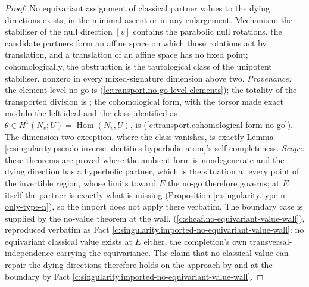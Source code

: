 \documentclass[11pt]{article}
\theoremstyle{definition}
\theoremstyle{plain}
\begin{document}
\begin{proof}
No equivariant assignment of classical partner values to the dying directions exists, in the minimal ascent or in any enlargement. Mechanism: the stabiliser of the null direction $[v]$ contains the parabolic null rotations, the candidate partners form an affine space on which those rotations act by translation, and a translation of an affine space has no fixed point; cohomologically, the obstruction is the tautological class of the unipotent stabiliser, nonzero in every mixed-signature dimension above two. \emph{Provenance:} the element-level no-go is \cite[Thm.~4.2]{ButlerT1} (\ref{c:transport.no-go-level-elements}); the totality of the transported division is \cite[Thm.~4.10]{ButlerT1}; the cohomological form, with the torsor made exact modulo the left ideal and the class identified as $\theta \in H^1(N_v; U) = \operatorname{Hom}(N_v, U)$, is \cite[Thm.~4.8]{ButlerT1} (\ref{c:transport.cohomological-form-no-go}). The dimension-two exception, where the class vanishes, is exactly Lemma \ref{c:singularity.pseudo-inverse-identities-hyperbolic-atom}'s self-completeness. \emph{Scope:} these theorems are proved where the ambient form is nondegenerate and the dying direction has a hyperbolic partner, which is the situation at every point of the invertible region, whose limits toward $E$ the no-go therefore governs; at $E$ itself the partner is exactly what is missing (Proposition \ref{c:singularity.type-n-only-type-n}), so the import does not apply there verbatim. The boundary case is supplied by the no-value theorem at the wall, \cite[Thm.~10.4]{ButlerT4} (\ref{c:sheaf.no-equivariant-value-wall}), reproduced verbatim as Fact \ref{c:singularity.imported-no-equivariant-value-wall}: no equivariant classical value exists at $E$ either, the completion's own transversal-independence carrying the equivariance. The claim that no classical value can repair the dying directions therefore holds on the approach by \cite[Thm.~4.2]{ButlerT1} and at the boundary by Fact \ref{c:singularity.imported-no-equivariant-value-wall}.

\end{proof}
\end{document}
